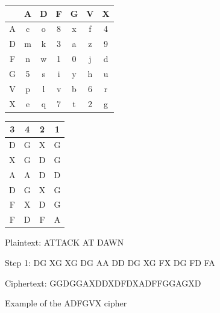 \documentclass{article}
\theoremstyle{plain}
\theoremstyle{definition}
\theoremstyle{remark}
\numberwithin{theorem}{section}
\newcommand{\bespokedemo}[1]{\href{bespoke:#1}{\textsf{[\,interactive: #1\,]}}}
\newif\ifweb \webfalse
\DeclareRobustCommand{\webonly}[1]{\ifweb#1\fi}
\DeclareRobustCommand{\printonly}[1]{\ifweb\else#1\fi}
\begin{document}
\begin{figure}

\begin{center}
\printonly{%
    \begin{minipage}[t]{.6\textwidth}
        \centering
 \begin{tabular}{c|cccccc}
       & A & D & F & G & V & X \\
       \hline
       A & c & o & 8 & x & f & 4 \\
       D & m & k & 3 & a & z & 9 \\
       F & n & w & 1 & 0 & j & d \\
       G & 5 & s & i & y & h & u \\
       V & p & l & v & b & 6 & r \\
       X & e & q & 7 & t & 2 & g \\
     \end{tabular}

    \end{minipage}%
    \begin{minipage}[t]{.4\textwidth}
        \centering
     \begin{tabular}{cccc}
       3 & 4 & 2 & 1 \\
       \hline
       D & G & X & G \\
       X & G & D & G \\
       A & A & D & D \\
       D & G & X & G \\
       F & X & D & G \\
       F & D & F & A
     \end{tabular}


    \end{minipage}
    \vspace{3em}


     Plaintext:  ATTACK AT DAWN \\
     \vspace{1em}

     Step 1:  DG XG XG DG AA DD DG XG FX DG FD FA \\
     \vspace{1em}

     Ciphertext:  GGDGGAXDDXDFDXADFFGGAGXD\\
     \vspace{1em}
}%
\webonly{\bespokedemo{adfgvx-demo}}
   \end{center}
\caption{Example of the ADFGVX cipher\webonly{.  Hover a plaintext or ciphertext letter to trace it through both stages}}
\label{fig:adfgvx-example}
\end{figure}
\end{document}
